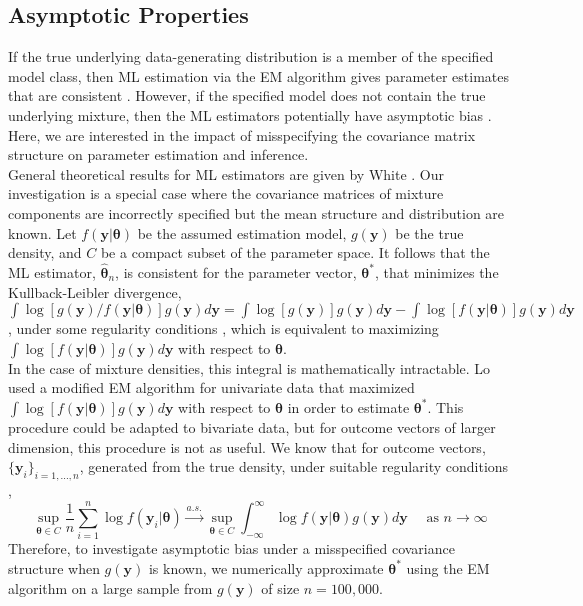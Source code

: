 \documentclass[10pt]{article}
\newcommand{\B}[0]{\mathbf}
\newcommand{\bs}[0]{\boldsymbol}
\begin{document}
\subsection{Asymptotic Properties}
If the true underlying data-generating distribution is a member of the specified model class, then ML estimation via the EM algorithm gives parameter estimates that are consistent  \cite{wald1949, lecam1953}. However, if the specified model does not contain the true underlying mixture, then the ML estimators potentially have asymptotic bias \cite{gray1994,lo2011}. Here, we are interested in the impact of misspecifying the covariance matrix structure on parameter estimation and inference.\\

General theoretical results for ML estimators are given by White \cite{white1982}. Our investigation is a special case where the covariance matrices of mixture components are incorrectly specified but the mean structure and distribution are known. Let $f(\B y|\bs \theta)$ be the assumed estimation model, $g(\B y)$ be the true density, and $C$ be a compact subset of the parameter space. It follows that the ML estimator, $\hat{\bs\theta}_{n}$, is consistent for the parameter vector, $\bs\theta^{*}$, that minimizes the Kullback-Leibler divergence, $\int \log[g(\B y)/f(\B y|\bs\theta)]g(\B y)d\B y=\int \log[g(\B y)]g(\B y)d\B y-\int \log[f(\B y|\bs\theta)]g(\B y)d\B y$, under some regularity conditions \cite{white1982}, which is equivalent to maximizing $\int \log[f(\B y|\bs\theta)]g(\B y)d\B y$ with respect to $\bs\theta$.  \\

In the case of mixture densities, this integral is mathematically intractable. Lo \cite{lo2011} used a modified EM algorithm for univariate data that maximized $\int \log[f(\B y|\bs\theta)]g(\B y)d\B y$  with respect to $\bs \theta$ in order to estimate $\bs\theta^{*}$. This procedure could be adapted to bivariate data, but for outcome vectors of larger dimension, this procedure is not as useful.  We know that for outcome vectors, $\{\B y_i\}_{i=1,...,n}$, generated from the true density, under suitable regularity conditions \cite{jennrich1969},
$$\sup_{\bs \theta\in C}\frac{1}{n}\sum_{i=1}^{n} \log f(\B y_{i}|\bs \theta)\overset{a.s.}{\longrightarrow} \sup_{\bs \theta\in C} \int^{\infty}_{-\infty} \log f(\B y|\bs \theta)g(\B y)d\B y \quad \text{ as } n\rightarrow \infty$$
Therefore, to investigate asymptotic bias under a misspecified covariance structure when $g(\B y)$ is known, we numerically approximate $\bs\theta^{*}$ using the EM algorithm on a large sample from $g(\B y)$ of size $n=100,000$. \\
\end{document}
